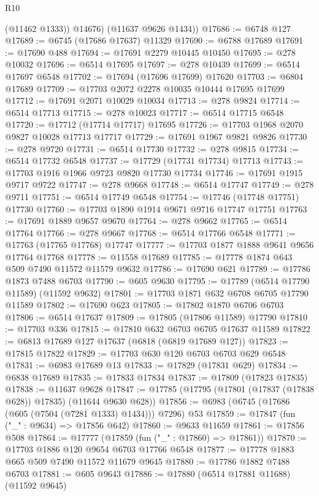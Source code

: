 \begin{lexlean}{R10}
\begin{coremodule}
          (@11462 @1333))
        @14676)
      (@11637 @9626 @1434))
@17686 := @6748 @127
@17689 := @6745 (@17686 @17637) @11329
@17690 := @6788 @17689
@17691 := @17690 @488
@17694 := @17691 @2279 @10445 @10450
@17695 := @278 @10032
@17696 := @6514 @17695
@17697 := @278 @10439
@17699 := @6514 @17697 @6548
@17702 := @17694 (@17696 @17699) @17620
@17703 := @6804 @17689
@17709 := @17703 @2072 @2278 @10035 @10444 @17695 @17699
@17712 := @17691 @2071 @10029 @10034
@17713 := @278 @9824
@17714 := @6514 @17713
@17715 := @278 @10023
@17717 := @6514 @17715 @6548
@17720 := @17712 (@17714 @17717) @17695
@17726 := @17703 @1968 @2070 @9827 @10028 @17713 @17717
@17729 := @17691 @1967 @9821 @9826
@17730 := @278 @9720
@17731 := @6514 @17730
@17732 := @278 @9815
@17734 := @6514 @17732 @6548
@17737 := @17729 (@17731 @17734) @17713
@17743 := @17703 @1916 @1966 @9723 @9820 @17730 @17734
@17746 := @17691 @1915 @9717 @9722
@17747 := @278 @9668
@17748 := @6514 @17747
@17749 := @278 @9711
@17751 := @6514 @17749 @6548
@17754 := @17746 (@17748 @17751) @17730
@17760 := @17703 @1890 @1914 @9671 @9716 @17747 @17751
@17763 := @17691 @1889 @9657 @9670
@17764 := @278 @9662
@17765 := @6514 @17764
@17766 := @278 @9667
@17768 := @6514 @17766 @6548
@17771 := @17763 (@17765 @17768) @17747
@17777 := @17703 @1877 @1888 @9641 @9656 @17764 @17768
@17778 := @11558 @17689
@17785 := @17778 @1874 @643 @509 @7490 @11572 @11579 @9632
@17786 := @17690 @621
@17789 := @17786 @1873 @7488 @6703
@17790 := @605 @9630
@17795 := @17789 (@6514 @17790 @11589) (@11592 @9632)
@17801 := @17703 @1871 @632 @6708 @6705 @17790 @11589
@17802 := @17690 @623
@17805 := @17802 @1870 @6706 @6703
@17806 := @6514 @17637
@17809 := @17805 (@17806 @11589) @17790
@17810 := @17703 @336
@17815 := @17810 @632 @6703 @6705 @17637 @11589
@17822 := @6813 @17689 @127 @17637 (@6818 (@6819 @17689 @127))
@17823 := @17815 @17822
@17829 := @17703 @630 @120 @6703 @6703 @629 @6548
@17831 := @6983 @17689 @13
@17833 := @17829 (@17831 @629)
@17834 := @6838 @17689
@17835 := @17833 @17834
@17837 := @17809 (@17823 @17835)
@17838 := @11637 @9628
@17847 := @17785 (@17795 (@17801 (@17837 (@17838 @628)) @17835) (@11644 @9630 @628))
@17856 := @6983 (@6745 (@17686 (@605 (@7504 (@7281 @1333) @1434))) @7296) @53
@17859 := @17847 (fun ("_" : @9634) => @17856 @642)
@17860 := @9633 @11659
@17861 := @17856 @508
@17864 := @17777 (@17859 (fun ("_" : @17860) => @17861))
@17870 := @17703 @1886 @120 @9654 @6703 @17766 @6548
@17877 := @17778 @1883 @665 @509 @7490 @11572 @11679 @9645
@17880 := @17786 @1882 @7488 @6703
@17881 := @605 @9643
@17886 := @17880 (@6514 @17881 @11688) (@11592 @9645)

\end{coremodule}
\end{lexlean}

